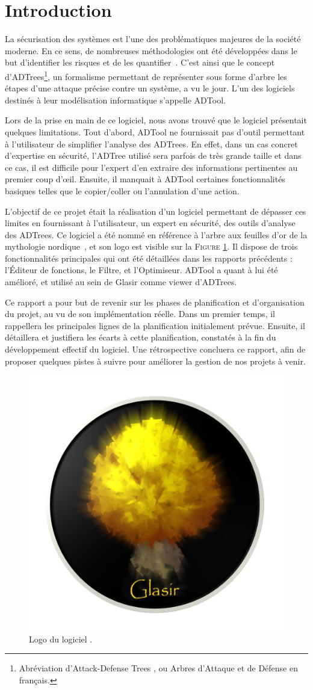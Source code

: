\section{Introduction}
\label{sec:intro}

	La sécurisation des systèmes est l'une des problématiques majeures de la société moderne. En ce sens, de nombreuses méthodologies ont été développées dans le but d'identifier les risques et de les quantifier~\cite{survey}. C'est ainsi que le concept d'ADTrees\footnote{Abréviation d'\og Attack-Defense Trees \fg{}, ou \og Arbres d'Attaque et de Défense\fg{} en français.}, un formalisme permettant de représenter sous forme d'arbre les étapes d'une attaque précise contre un système, a vu le jour. L'un des logiciels destinés à leur modélisation informatique s'appelle ADTool.

    Lors de la prise en main de ce logiciel, nous avons trouvé que le logiciel présentait quelques limitations. Tout d'abord, ADTool ne fournissait pas d'outil permettant à l'utilisateur de simplifier l'analyse des ADTrees. En effet, dans un cas concret d'expertise en sécurité, l'ADTree utilisé sera parfois de très grande taille et dans ce cas, il est difficile pour l'expert d'en extraire des informations pertinentes au premier coup d’œil. Ensuite, il manquait à ADTool certaines fonctionnalités \og basiques \fg{} telles que le copier/coller ou l'annulation d'une action. 

    L'objectif de ce projet était la réalisation d'un logiciel permettant de dépasser ces limites en fournissant à l'utilisateur, un expert en sécurité, des outils d'analyse des ADTrees. Ce logiciel a été nommé \glasir{} en référence à l'arbre aux feuilles d'or de la mythologie nordique~\cite{vikingCulture}, et son logo est visible sur la \textsc{Figure} \ref{fig:glasir}. Il dispose de trois fonctionnalités principales qui ont été détaillées dans les rapports précédents : l'Éditeur de fonctions, le Filtre, et l'Optimiseur. ADTool a quant à lui été amélioré, et utilisé au sein de Glasir comme viewer d'ADTrees.

    Ce rapport a pour but de revenir sur les phases de planification et d'organisation du projet, au vu de son implémentation réelle. Dans un premier temps, il rappellera les principales lignes de la planification initialement prévue. Ensuite, il détaillera et justifiera les écarts à cette planification, constatés à la fin du développement effectif du logiciel. Une rétrospective concluera ce rapport, afin de proposer quelques pistes à suivre pour améliorer la gestion de nos projets à venir.

    \begin{figure}[h!]
        \centering
        \includegraphics[height=0.4\textwidth]{figure/glasir.png}
        \caption{Logo du logiciel \glasir{}.}
        \label{fig:glasir}
    \end{figure}